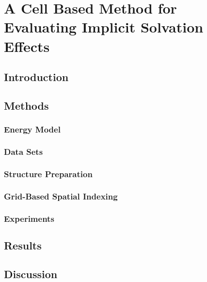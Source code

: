 \chapter[Cell Based Implicit Solvent Model]{A Cell Based Method for Evaluating Implicit Solvation Effects}
\label{chapter:cell_solvent}


\section{Introduction}
\label{section:cell/intro}


\section{Methods}
\label{section:cell/methods}
    \subsection{Energy Model}
    \label{subsection:energy_model}
    

    \subsection{Data Sets}
    \label{subsection:data_sets}
    

    \subsection{Structure Preparation}
    \label{subsection:structure_preparation}
    

    \subsection{Grid-Based Spatial Indexing}
    \label{subsection:grid_based_indexing}
    

    \subsection{Experiments}
    \label{subsection:experiments}
    

\section{Results}
\label{section:cell/results}


\section{Discussion}
\label{section:cell/discussion}

